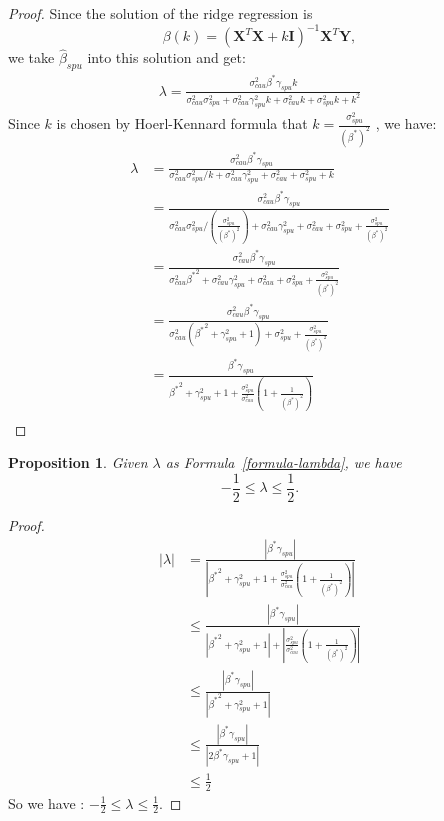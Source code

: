 \documentclass{article}
\theoremstyle{plain}
\newtheorem{proposition}[theorem]{Proposition}
\theoremstyle{definition}
\theoremstyle{remark}
\begin{document}
\begin{proof}
Since the solution of the ridge regression is $$\beta(k)=(\textbf{X}^T\textbf{X}+k\textbf{I})^{-1}\textbf{X}^T\textbf{Y},$$
we take $\hat{\beta}_{spu}$ into this solution and get: 
\begin{align}
\lambda=\frac{\sigma ^{2}_{cau} \beta^*\gamma_{spu}k}{\sigma ^{2}_{cau} \sigma ^{2}_{spu} +\sigma ^{2}_{cau} \gamma_{spu}^{2} k+\sigma ^{2}_{cau} k+\sigma ^{2}_{spu} k+k^{2}}
\end{align}
Since $k$ is chosen by  Hoerl-Kennard formula that $k=\frac{\sigma^2_{spu}}{(\beta^*)^2}$ , we have:
\begin{align*}
\lambda
&=\frac{\sigma ^{2}_{cau} \beta^*\gamma_{spu}}{\sigma ^{2}_{cau} \sigma ^{2}_{spu} /k+\sigma ^{2}_{cau} \gamma_{spu}^{2}+\sigma ^{2}_{cau}+\sigma ^{2}_{spu}+k}\\
&=\frac{\sigma ^{2}_{cau} \beta^*\gamma_{spu}}{\sigma ^{2}_{cau} \sigma ^{2}_{spu} /(\frac{\sigma^2_{spu}}{(\beta^*)^2})+\sigma ^{2}_{cau} \gamma_{spu}^{2}+\sigma ^{2}_{cau}+\sigma ^{2}_{spu}+\frac{\sigma^2_{spu}}{(\beta^*)^2}}\\
&=\frac{\sigma ^{2}_{cau} \beta^*\gamma_{spu}}{\sigma ^{2}_{cau}{\beta^*}^2+\sigma ^{2}_{cau} \gamma_{spu}^{2}+\sigma ^{2}_{cau}+\sigma ^{2}_{spu}+\frac{\sigma^2_{spu}}{(\beta^*)^2}}\\
&=\frac{\sigma ^{2}_{cau} \beta^*\gamma_{spu}}{\sigma ^{2}_{cau}({\beta^*}^2+ \gamma_{spu}^{2}+1)+\sigma ^{2}_{spu}+\frac{\sigma^2_{spu}}{(\beta^*)^2}}\\
&=\frac{ \beta^*\gamma_{spu}}{{\beta^*}^2+ \gamma_{spu}^{2}+1+\frac{\sigma ^{2}_{spu}}{\sigma^2_{cau}}(1+\frac{1}{(\beta^*)^2})}\\
\end{align*}
\end{proof}

\begin{proposition}
Given $\lambda$ as Formula~\ref{formula-lambda}, we have
$$
-\frac{1}{2}\leq\lambda\leq\frac{1}{2}.
$$
\end{proposition}


\begin{proof}
\begin{align*}
|\lambda|
&=\frac{| \beta^*\gamma_{spu}|}{|{\beta^*}^2+ \gamma_{spu}^{2}+1+\frac{\sigma ^{2}_{spu}}{\sigma^2_{cau}}(1+\frac{1}{(\beta^*)^2})|}\\
&\leq \frac{| \beta^*\gamma_{spu}|}{|{\beta^*}^2+ \gamma_{spu}^{2}+1|+|\frac{\sigma ^{2}_{spu}}{\sigma^2_{cau}}(1+\frac{1}{(\beta^*)^2})|}\\
&\leq \frac{| \beta^*\gamma_{spu}|}{|{\beta^*}^2+ \gamma_{spu}^{2}+1|}\\
&\leq \frac{| \beta^*\gamma_{spu}|}{|2{\beta^*}\gamma_{spu}+1|}\\
&\leq \frac{1}{2}
\end{align*}
So we have :  $-\frac{1}{2}\leq\lambda\leq\frac{1}{2}$.
\end{proof}
\end{document}
